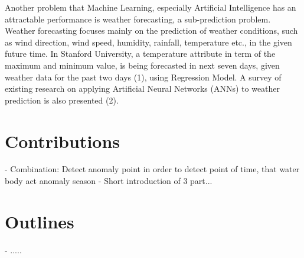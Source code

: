 

Another problem that Machine Learning, especially Artificial Intelligence has an attractable performance is weather forecasting, a sub-prediction problem. Weather forecasting focuses mainly on the prediction of weather conditions, such as wind direction, wind speed, humidity, rainfall, temperature etc., in the given future time. In Stanford University, a temperature attribute in term of the maximum and minimum value, is being forecasted in next seven days, given weather data for the past two days (1), using Regression Model. A survey of existing research on applying Artificial Neural Networks (ANNs) to weather prediction is also presented (2).




\section{Contributions} %

- Combination: Detect anomaly point in order to detect point of time, that water body act anomaly season
- Short introduction of 3 part...

\section{Outlines} %
- .....
